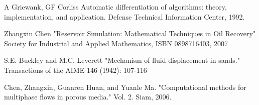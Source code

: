 \documentclass[a4paper,onecolumn]{article}
\theoremstyle{remark}
\begin{document}
\begin{thebibliography}{9}
%
A Griewank, GF Corliss
Automatic differentiation of algorithms: theory, implementation, and application.
Defense Technical Information Center, 1992.

%
Zhangxin Chen
"Reservoir Simulation: Mathematical Techniques in Oil Recovery"
Society for Industrial and Applied Mathematics, ISBN 0898716403, 2007

%

%
S.E. Buckley and M.C. Leverett
"Mechanism of fluid displacement in sands."
Transactions of the AIME 146 (1942): 107-116

%
Chen, Zhangxin, Guanren Huan, and Yuanle Ma. 
"Computational methods for multiphase flows in porous media."
Vol. 2. Siam, 2006.

%
%
%
%
%
%
%
%


\end{thebibliography}
\end{document}
